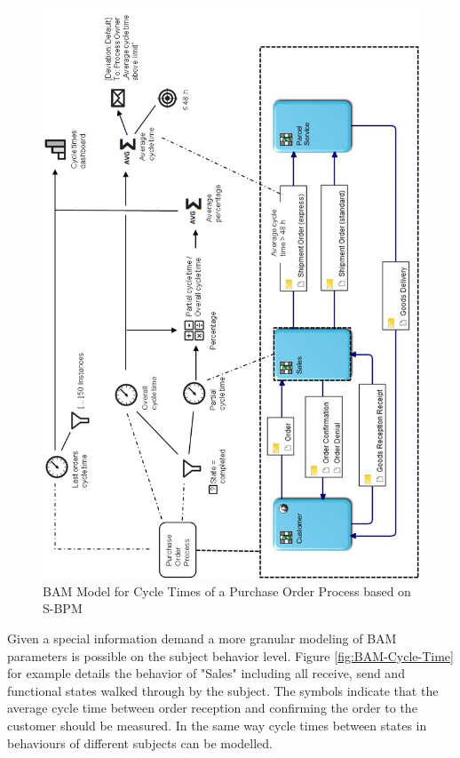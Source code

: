 \begin{figure}[htbp]
	\centering
	\includegraphics[width=0.9\linewidth]{Figures/Chapter5/Monitoring/BAM-Model-fo- Cycle-Times-of-a-Purchase-Order-Process-based-on-S-BPM.png}
	\caption[BAM Model for Cycle Times of a Purchase Order Process based on S-BPM]{BAM Model for Cycle Times of a Purchase Order Process based on S-BPM}
	\label{fig:Cycle-Time-SBPM}
\end{figure}

Given a special information demand a more granular modeling of BAM parameters is possible on the subject behavior level. Figure \ref{fig:BAM-Cycle-Time} for example details the behavior of "Sales" including all receive, send and functional states walked through by the subject. The symbols indicate that the average cycle time between order reception and confirming the order to the customer should be measured. In the same way cycle times between states in behaviours of different subjects can be modelled.


